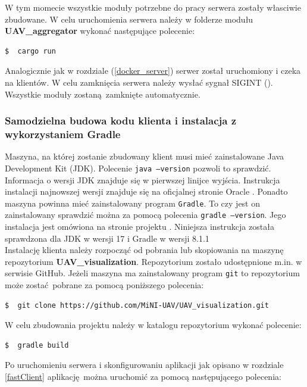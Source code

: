 \documentclass[15pt]{sprawozdanie}
\begin{document}
W tym momecie wszystkie moduły potrzebne do pracy serwera zostały własciwie zbudowane. W celu uruchomienia serwera należy w folderze modułu \textbf{UAV\_aggregator} wykonać następujące polecenie:
\begin{lstlisting}[language=bash]
  $  cargo run
\end{lstlisting}

Analogicznie jak w rozdziale (\ref{docker_server}) serwer został uruchomiony i czeka na klientów. W celu zamknięcia serwera należy wysłać sygnał SIGINT (). Wszystkie moduły zostaną zamknięte automatycznie.

\subsubsection{Samodzielna budowa kodu klienta i instalacja z wykorzystaniem Gradle}
 
Maszyna, na której zostanie zbudowany klient musi mieć zainstalowane Java Development Kit (JDK). Polecenie \texttt{java --version} pozwoli to sprawdzić. Informacja o wersji JDK znajduje się w pierwszej linijce wyjścia. Instrukcja instalacji najnowszej wersji znajduje się na oficjalnej stronie Oracle \cite{javaDown}. Ponadto maszyna powinna mieć zainstalowany program \texttt{Gradle}. To czy jest on zainstalowany sprawdzić można za pomocą polecenia \texttt{gradle --version}. Jego instalacja jest omówiona na stronie projektu \cite{gradle}. Niniejsza instrukcja została sprawdzona dla JDK w wersji 17 i Gradle w wersji 8.1.1 \\


Instalację klienta należy rozpocząć od pobrania lub skopiowania na maszynę repozytorium \textbf{UAV\_visualization}. Repozytorium zostało udostępnione m.in. w serwisie GitHub. Jeżeli maszyna ma zainstalowany program \texttt{git} to repozytorium może zostać pobrane za pomocą poniższego polecenia:

\begin{lstlisting}[language=bash]
  $  git clone https://github.com/MiNI-UAV/UAV_visualization.git 
\end{lstlisting}

W celu zbudowania projektu należy w katalogu repozytorium wykonać polecenie:

\begin{lstlisting}[language=bash]
  $  gradle build
\end{lstlisting} 

Po uruchomieniu serwera i skonfigurowaniu aplikacji jak opisano w rozdziale \ref{fastClient} aplikację można uruchomić za pomocą następującego polecenia:
\end{document}
